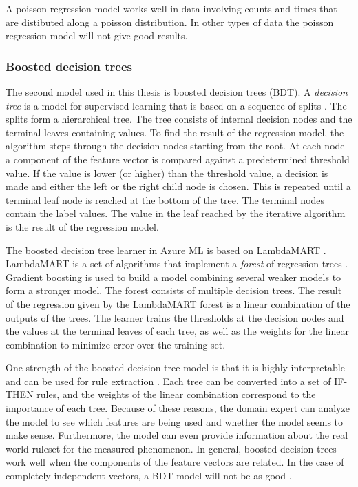 
A poisson regression model works well in data involving counts and times that are distibuted along a poisson distribution. 
In other types of data the poisson regression model will not give good results.

\subsubsection{Boosted decision trees}

The second model used in this thesis is boosted decision trees (BDT).
A \textit{decision tree} is a model for supervised learning that is based on a sequence of splits \cite{alpaydin}.
The splits form a hierarchical tree.
The tree consists of internal decision nodes and the terminal leaves containing values.
To find the result of the regression model, the algorithm steps through the decision nodes starting from the root.
At each node a component of the feature vector is compared against a predetermined threshold value.
If the value is lower (or higher) than the threshold value, a decision is made and either the left or the right child node is chosen.
This is repeated until a terminal leaf node is reached at the bottom of the tree. 
The terminal nodes contain the label values.
The value in the leaf reached by the iterative algorithm is the result of the regression model.

The boosted decision tree learner in Azure ML is based on LambdaMART \cite{azurebdt}.
LambdaMART is a set of algorithms that implement a \textit{forest} of regression trees \cite{lambdamart2010}.
Gradient boosting \cite{friedman2001greedy} is used to build a model combining several weaker models to form a stronger model.
The forest consists of multiple decision trees.
The result of the regression given by the LambdaMART forest is a linear combination of the outputs of the trees.
The learner trains the thresholds at the decision nodes and the values at the terminal leaves of each tree, as well as the weights for the linear combination to minimize error over the training set.


One strength of the boosted decision tree model is that it is highly interpretable and can be used for rule extraction \cite{alpaydin}. Each tree can be converted into a set of IF-THEN rules, and the weights of the linear combination correspond to the importance of each tree. 
Because of these reasons, the domain expert can analyze the model to see which features are being used and whether the model seems to make sense.
Furthermore, the model can even provide information about the real world ruleset for the measured phenomenon.
In general, boosted decision trees work well when the components of the feature vectors are related. In the case of completely independent vectors, a BDT model will not be as good \cite{azurebdt}.

